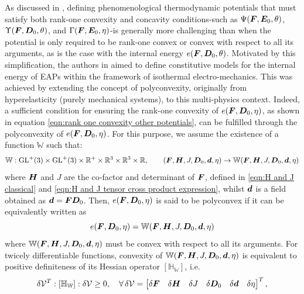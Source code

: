  
 
 


As discussed in \cite{XX}, defining phenomenological thermodynamic potentials that must satisfy both rank-one convexity and concavity conditions-such as $\Psi(\boldsymbol{F},\boldsymbol{E}_0,\theta)$, $\Upsilon(\boldsymbol{F},\boldsymbol{D}_0,\theta)$, and $\Gamma(\boldsymbol{F},\boldsymbol{E}_0,\eta)$-is generally more challenging than when the potential is only required to be rank-one convex or convex with respect to all its arguments, as is the case with the internal energy $e(\boldsymbol{F},\boldsymbol{D}_0,\theta)$. Motivated by this simplification, the authors in \cite{XX} aimed to define constitutive models for the internal energy of EAPs within the framework of isothermal electro-mechanics. This was achieved by extending the concept of polyconvexity, originally from hyperelasticity (purely mechanical systems), to this multi-physics context. Indeed, a sufficient condition for ensuring the rank-one convexity of $e(\boldsymbol{F},\boldsymbol{D}_0,\eta)$, as shown in equation \eqref{eqn:rank one convexity other potentials}, can be fulfilled through the polyconvexity of $e(\boldsymbol{F},\boldsymbol{D}_0,\eta)$. For this purpose, we assume the existence of a function $\mathbb{W}$ such that:
%
\begin{equation}
\mathbb{W}:\text{GL}^{+}(3)\times \text{GL}^{+}(3)\times \mathbb{R}^{+}\times \mathbb{R}^3\times \mathbb{R}^3\times \mathbb{R},\qquad (\boldsymbol{F},\boldsymbol{H},J,\boldsymbol{D}_0,\boldsymbol{d},\eta)\rightarrow \mathbb{W}(\boldsymbol{F},\boldsymbol{H},J,\boldsymbol{D}_0,\boldsymbol{d},\eta)
\end{equation}
%
where $\boldsymbol{H}$ and $J$ are the co-factor and determinant of $\boldsymbol{F}$, defined in \eqref{eqn:H and J classical} and \eqref{eqn:H and J tensor cross product expression}, whilst $\boldsymbol{d}$ is a field obtained as $\boldsymbol{d}=\boldsymbol{FD}_0$. Then, $e(\boldsymbol{F},\boldsymbol{D}_0,\eta)$ is said to be polyconvex \cite{Ball_1976,Ball_2002,Ball_Murat_1976} if it can be equivalently written as
%
\begin{equation}\label{eqn:polyconvexity}
e(\boldsymbol{F},\boldsymbol{D}_0,\eta)=\mathbb{W}(\boldsymbol{F},\boldsymbol{H},J,\boldsymbol{D}_0,\boldsymbol{d},\eta)
\end{equation}
%
where $\mathbb{W}(\boldsymbol{F},\boldsymbol{H},J,\boldsymbol{D}_0,\boldsymbol{d},\eta)$ must be convex with respect to all its arguments. For twicely differentiable functions, convexity of $\mathbb{W}(\boldsymbol{F},\boldsymbol{H},J,\boldsymbol{D}_0,\boldsymbol{d},\eta)$ is equivalent to positive definiteness of its Hessian operator $[\mathbb{H}_{\mathbb{W}}]$, i.e.
%
\begin{equation}
\delta{\mathcal{V}}^T:[\mathbb{H}_{\mathbb{W}}]:\delta{\mathcal{V}}\geq 0,\quad \forall\, \delta\mathcal{V}=\begin{bmatrix}\delta\boldsymbol{F} & \delta\boldsymbol{H} & \delta J & \delta\boldsymbol{D}_0 & \delta\boldsymbol{d} & \delta \eta
\end{bmatrix}^T,
\end{equation}
